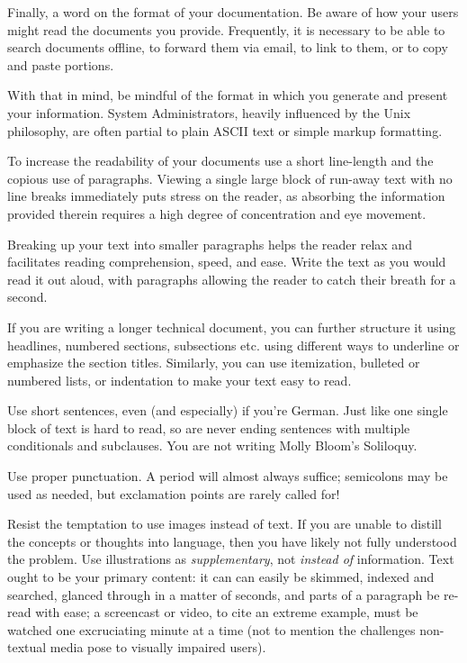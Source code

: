Finally, a word on the format of your documentation.
Be aware of how your users might read the documents
you provide.  Frequently, it is necessary to be able
to search documents offline, to forward them via
email, to link to them, or to copy and paste
portions.

With that in mind, be mindful of the format in which
you generate and present your information.  System
Administrators, heavily influenced by the Unix
philosophy, are often partial
to plain ASCII text or simple markup formatting.

To increase the readability of your documents use a
short line-length and the copious use of paragraphs.
Viewing a single large block of run-away text with no
line breaks immediately puts stress on the reader, as
absorbing the information provided therein requires a
high degree of concentration and eye movement.

Breaking up your text into smaller paragraphs helps
the reader relax and facilitates reading
comprehension, speed, and ease.  Write the text as you
would read it out aloud, with paragraphs allowing the
reader to catch their breath for a second.

If you are writing a longer technical document, you
can further structure it using headlines, numbered
sections, subsections etc. using different ways to
underline or emphasize the section titles.  Similarly,
you can use itemization, bulleted or numbered lists,
or indentation to make your text easy to read.

Use short sentences, even (and especially) if you're
German.  Just like one single block of text is hard to
read, so are never ending sentences with multiple
conditionals and subclauses.  You are not writing
Molly Bloom's Soliloquy.

Use proper punctuation.  A period will almost always
suffice; semicolons may be used as needed, but
exclamation points are rarely called for!

Resist the temptation to use images instead of text.
If you are unable to distill the concepts or thoughts
into language, then you have likely not fully
understood the problem.  Use illustrations as {\em
supplementary}, not {\em instead of} information.
Text ought to be your primary content: it can can
easily be skimmed, indexed and searched, glanced
through in a matter of seconds, and parts of a
paragraph be re-read with ease; a screencast or video,
to cite an extreme example, must be watched one
excruciating minute at a time (not to mention the
challenges non-textual media pose to visually impaired
users). \\

